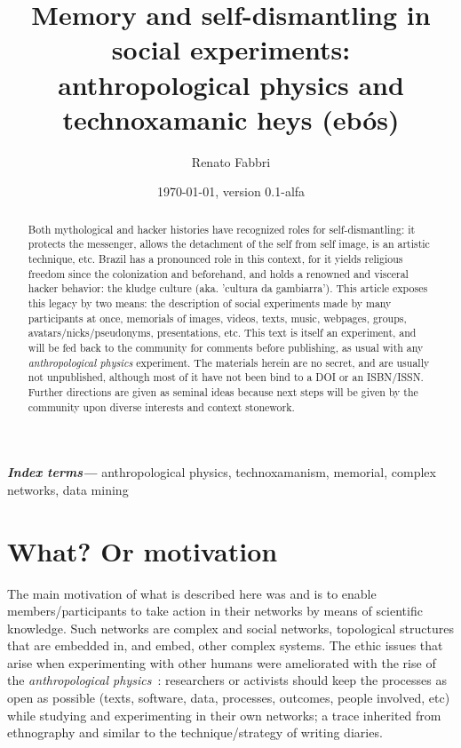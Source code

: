 \documentclass[a4paper]{article}
\title{
Memory and self-dismantling in social experiments:\\
anthropological physics and technoxamanic heys (ebós)
}
\author{Renato Fabbri}
\date{\today, version 0.1-alfa}
\providecommand{\keywords}[1]{\textbf{\textit{Index terms---}} #1}
\begin{document}
\maketitle



\begin{abstract}
Both mythological and hacker histories have recognized roles for
self-dismantling: it protects the messenger, allows the detachment of the self
from self image, is an artistic technique, etc.  Brazil has a pronounced role
in this context, for it yields religious freedom since the colonization and
beforehand, and holds a renowned and visceral hacker behavior: the kludge
culture (aka. 'cultura da gambiarra').  This article exposes this legacy by two
means: the description of social experiments made by many participants at once,
memorials of images, videos, texts, music, webpages, groups,
avatars/nicks/pseudonyms, presentations, etc.  This text is itself an
experiment, and will be fed back to the community for comments before
publishing, as usual with any \emph{anthropological physics} experiment.  The
materials herein are no secret, and are usually not unpublished, although most
of it have not been bind to a DOI or an ISBN/ISSN.  Further directions are given as
seminal ideas because next steps will be given by the community upon diverse
interests and context stonework.
\end{abstract}

\keywords{
anthropological physics, technoxamanism, memorial, complex networks,
data mining
}

\tableofcontents

\section{What? Or motivation}
The main motivation of what is described here was and is to enable
members/participants to take action in their networks by means of scientific
knowledge.  Such networks are complex and social networks, topological
structures that are embedded in, and embed, other complex systems.  The ethic
issues that arise when experimenting with other humans were ameliorated with
the rise of the \emph{anthropological physics}~\cite{anPhy,anPhy2,thesis}:
researchers or activists should keep the processes as open as possible (texts,
software, data, processes, outcomes, people involved, etc) while studying and
experimenting in their own networks; a trace inherited from ethnography and
similar to the technique/strategy of writing diaries.
\end{document}
